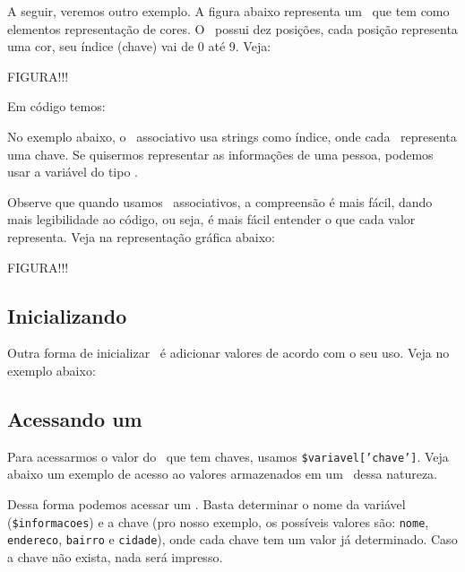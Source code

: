 A seguir, veremos outro exemplo. A figura abaixo representa um \tipoarray~que tem 
como elementos representação de cores. O \tipoarray~possui dez posições, 
cada posição representa uma cor, seu índice (chave) vai de 0 até 9. Veja:

FIGURA!!!

Em código temos:



No exemplo abaixo, o \tipoarray~associativo usa strings como índice, onde cada 
\tipostring~representa uma chave. Se quisermos representar as informações de uma
pessoa, podemos usar a variável do tipo \tipoarray.



Observe que quando usamos \tipoarrays~associativos, a compreensão é mais fácil, 
dando mais legibilidade ao código, ou seja, é mais fácil entender o que cada valor
representa. Veja na representação gráfica abaixo:

FIGURA!!!

\subsection{Inicializando \tipoarrays}
\label{inicializando-arrays}

Outra forma de inicializar \tipoarrays~é adicionar valores de acordo com o seu 
uso. Veja no exemplo abaixo:



\subsection{Acessando um \tipoarray}
\label{acessando-um-array}

Para acessarmos o valor do \tipoarray~que tem chaves, usamos \texttt{\$variavel['chave']}. 
Veja abaixo um exemplo de acesso ao valores armazenados em um \tipoarray~dessa natureza.



Dessa forma podemos acessar um \tipoarray. Basta determinar o nome da variável
(\texttt{\$informacoes}) e a chave (pro nosso exemplo, os possíveis valores são:
\texttt{nome}, \texttt{endereco}, \texttt{bairro} e \texttt{cidade}), onde cada chave tem 
um valor já determinado. Caso a chave não exista, nada será impresso.

